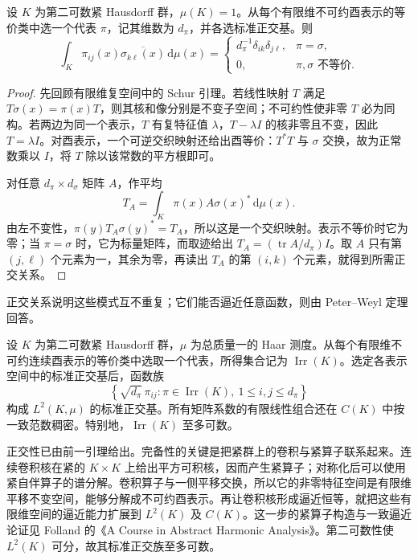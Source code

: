 \begin{lemma}
\label{b2:lem:I5-schur-orthogonality}
设 \(K\) 为第二可数紧 Hausdorff 群，\(\mu(K)=1\)。从每个有限维不可约酉表示的等价类中选一个代表 \(\pi\)，记其维数为 \(d_\pi\)，并各选标准正交基。则
\[
 \int_K\pi_{ij}(x)\overline{\sigma_{k\ell}(x)}\,\mathrm d\mu(x)
 =\begin{cases}
 d_\pi^{-1}\delta_{ik}\delta_{j\ell},&\pi=\sigma,\\
 0,&\pi,\sigma\text{ 不等价}.
 \end{cases}
\]
\end{lemma}
\begin{proof}
先回顾有限维复空间中的 Schur 引理。若线性映射 \(T\) 满足 \(T\sigma(x)=\pi(x)T\)，则其核和像分别是不变子空间；不可约性使非零 \(T\) 必为同构。若两边为同一个表示，\(T\) 有复特征值 \(\lambda\)，\(T-\lambda I\) 的核非零且不变，因此 \(T=\lambda I\)。对酉表示，一个可逆交织映射还给出酉等价：\(T^*T\) 与 \(\sigma\) 交换，故为正常数乘以 \(I\)，将 \(T\) 除以该常数的平方根即可。

对任意 \(d_\pi\times d_\sigma\) 矩阵 \(A\)，作平均
\[
 T_A=\int_K\pi(x)A\sigma(x)^*\,\mathrm d\mu(x).
\]
由左不变性，\(\pi(y)T_A\sigma(y)^*=T_A\)，所以这是一个交织映射。表示不等价时它为零；当 \(\pi=\sigma\) 时，它为标量矩阵，而取迹给出
\(T_A=(\operatorname{tr}A/d_\pi)I\)。取 \(A\) 只有第 \((j,\ell)\) 个元素为一，其余为零，再读出 \(T_A\) 的第 \((i,k)\) 个元素，就得到所需正交关系。
\end{proof}

正交关系说明这些模式互不重复；它们能否逼近任意函数，则由 Peter--Weyl 定理回答。

\begin{claim}
\label{b2:claim:I5-peter-weyl}
设 \(K\) 为第二可数紧 Hausdorff 群，\(\mu\) 为总质量一的 Haar 测度。从每个有限维不可约连续酉表示的等价类中选取一个代表，所得集合记为 \(\operatorname{Irr}(K)\)。选定各表示空间中的标准正交基后，函数族
\[
 \left\{\sqrt{d_\pi}\,\pi_{ij}:
 \pi\in\operatorname{Irr}(K),\ 1\le i,j\le d_\pi\right\}
\]
构成 \(L^2(K,\mu)\) 的标准正交基。所有矩阵系数的有限线性组合还在 \(C(K)\) 中按一致范数稠密。特别地，\(\operatorname{Irr}(K)\) 至多可数。
\end{claim}
\begin{proofsketch}
正交性已由前一引理给出。完备性的关键是把紧群上的卷积与紧算子联系起来。连续卷积核在紧的 \(K\times K\) 上给出平方可积核，因而产生紧算子；对称化后可以使用紧自伴算子的谱分解。卷积算子与一侧平移交换，所以它的非零特征空间是有限维平移不变空间，能够分解成不可约酉表示。再让卷积核形成逼近恒等，就把这些有限维空间的逼近能力扩展到 \(L^2(K)\) 及 \(C(K)\)。这一步的紧算子构造与一致逼近论证见 Folland 的《A Course in Abstract Harmonic Analysis》\cite[Section 5.2]{Folland2016Abstract}。第二可数性使 \(L^2(K)\) 可分，故其标准正交族至多可数。
\end{proofsketch}

